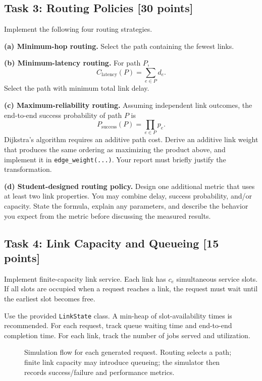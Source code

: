 \documentclass[11pt]{article}
\newcommand{\points}[1]{\hfill\textbf{[#1 points]}}
\begin{document}
\subsection{Task 3: Routing Policies \points{30}}
Implement the following four routing strategies.

\textbf{(a) Minimum-hop routing.} Select the path containing the fewest links.

\textbf{(b) Minimum-latency routing.} For path $P$,
\[
C_{\mathrm{latency}}(P)=\sum_{e\in P} d_e.
\]
Select the path with minimum total link delay.

\textbf{(c) Maximum-reliability routing.} Assuming independent link outcomes, the end-to-end success probability of path $P$ is
\[
P_{\mathrm{success}}(P)=\prod_{e\in P}p_e.
\]
Dijkstra's algorithm requires an additive path cost. Derive an additive link weight that produces the same ordering as maximizing the product above, and implement it in \texttt{edge\_weight(...)}. Your report must briefly justify the transformation.

\textbf{(d) Student-designed routing policy.} Design one additional metric that uses at least two link properties. You may combine delay, success probability, and/or capacity. State the formula, explain any parameters, and describe the behavior you expect from the metric before discussing the measured results.

\subsection{Task 4: Link Capacity and Queueing \points{15}}
Implement finite-capacity link service. Each link has $c_e$ simultaneous service slots. If all slots are occupied when a request reaches a link, the request must wait until the earliest slot becomes free.

Use the provided \texttt{LinkState} class. A min-heap of slot-availability times is recommended. For each request, track queue waiting time and end-to-end completion time. For each link, track the number of jobs served and utilization.

\begin{figure}[ht]
\centering
{}
\caption{Simulation flow for each generated request. Routing selects a path; finite link capacity may introduce queueing; the simulator then records success/failure and performance metrics.}
\label{fig:flow}
\end{figure}
\end{document}

